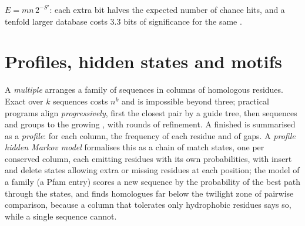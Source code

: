 \begin{omfigure}

{\small $E = mn\,2^{-S'}$: each extra bit halves the expected number
of chance hits, and a tenfold larger database costs $3.3$ bits of
significance for the same .}
\end{omfigure}

\section{Profiles, hidden states and motifs}

\begin{definition}\label{def:b3:bioinformatics:msa}
A \emph{multiple } arranges a family of sequences in
columns of homologous residues. Exact  over $k$
sequences costs $n^{k}$ and is impossible beyond three; practical
programs align \emph{progressively}, first the closest pair by a guide
tree, then sequences and groups to the growing , with rounds
of refinement. A finished  is summarised as a \emph{profile}:
for each column, the frequency of each residue and of gaps. A
\emph{profile hidden Markov model} formalises this as a chain of match
states, one per conserved column, each emitting residues with its own
probabilities, with insert and delete states allowing extra or missing
residues at each position; the model of a family (a Pfam entry) scores
a new sequence by the probability of the best path through the states,
and finds homologues far below the twilight zone of pairwise
comparison, because a column that tolerates only hydrophobic residues
says so, while a single sequence cannot.
\end{definition}

